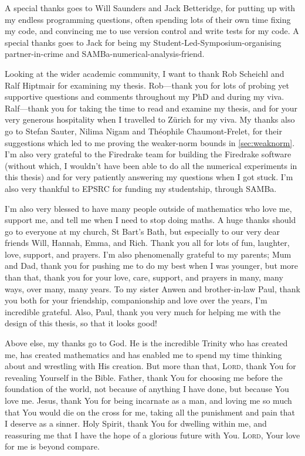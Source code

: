 {  A special thanks goes to Will Saunders and Jack Betteridge, for putting up with my endless programming questions, often spending lots of their own time fixing my code, and convincing me to use version control and write tests for my code. A special thanks goes to Jack for being my Student-Led-Symposium-organising partner-in-crime and SAMBa-numerical-analysis-friend. 

  Looking at the wider academic community, I want to thank Rob Scheichl and Ralf Hiptmair for examining my thesis. Rob---thank you for lots of probing yet supportive questions and comments throughout my PhD and during my viva. Ralf---thank you for taking the time to read and examine my thesis, and for your very generous hospitality when I travelled to Z\"urich for my viva. My thanks also go to Stefan Sauter, Nilima Nigam and Th\'eophile Chaumont-Frelet, for their suggestions which led to me proving the weaker-norm bounds in \cref{sec:weaknorm}. I'm also very grateful to the Firedrake team for building the Firedrake software (without which, I wouldn't have been able to do all the numerical experiments in this thesis) and for very patiently answering my questions when I got stuck. I'm also very thankful to EPSRC for funding my studentship, through SAMBa.
  
I'm also very blessed to have many people outside of mathematics who love me, support me, and tell me when I need to stop doing maths. A huge thanks should go to everyone at my church, St Bart's Bath, but especially to our very dear friends Will, Hannah, Emma, and Rich. Thank you all for lots of fun, laughter, love, support, and prayers. I'm also phenomenally grateful to my parents; Mum and Dad, thank you for pushing me to do my best when I was younger, but more than that, thank you for your love, care, support, and prayers in many, many ways, over many, many years. To my sister Anwen and brother-in-law Paul, thank you both for your friendship, companionship and love over the years, I'm incredible grateful. Also, Paul, thank you very much for helping me with the design of this thesis, so that it looks good!

Above else, my thanks go to God. He is the incredible Trinity who has created me, has created mathematics and has enabled me to spend my time thinking about and wrestling with His creation. But more than that, L\textsc{ord}, thank You for revealing Yourself in the Bible. Father, thank You for choosing me before the foundation of the world, not because of anything I have done, but because You love me. Jesus, thank You for being incarnate as a man, and loving me so much that You would die on the cross for me, taking all the punishment and pain that I deserve as a sinner. Holy Spirit, thank You for dwelling within me, and reassuring me that I have the hope of a glorious future with You. L\textsc{ord}, Your love for me is beyond compare.
\thispagestyle{plain} %

}
